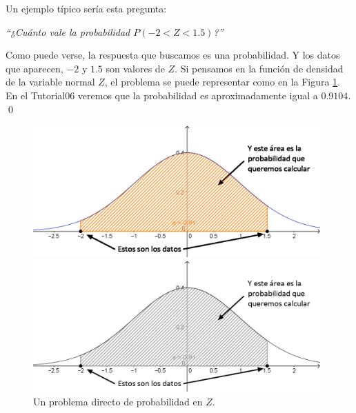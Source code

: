 \begin{ejemplo}
\label{cap06:ejem:ProblemaDirectoProbabilidadZ}
Un ejemplo típico sería esta pregunta:
\begin{center}
{\em ``¿Cuánto vale la probabilidad $P(-2 < Z < 1.5)$?''}
\end{center}
Como puede verse, la respuesta que buscamos es una probabilidad. Y los datos
que aparecen, $-2$ y $1.5$ son valores de $Z$. Si pensamos en la función de
densidad de la variable normal $Z$, el problema se puede representar como en la
Figura \ref{cap06:fig:ValoresCriticos01}. En el Tutorial06 veremos que la probabilidad es aproximadamente igual a $0.9104$. \qed

\begin{figure}[h]
\begin{center}
\begin{enColor}
\includegraphics[width=11cm]{../fig/Cap06-ValoresCriticos01.png}
\end{enColor}
\begin{bn}
\includegraphics[width=11cm]{../fig/Cap06-ValoresCriticos01-bn.png}
\end{bn}
\caption{Un problema directo de probabilidad en $Z$.}
\label{cap06:fig:ValoresCriticos01}
\end{center}
\end{figure}
\end{ejemplo}

